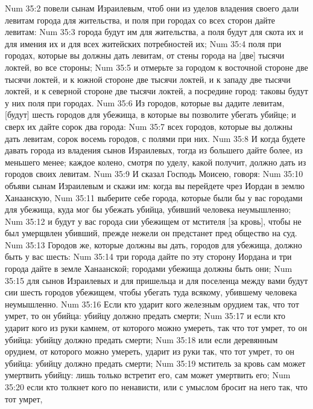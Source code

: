 \vs Num 35:2 повели сынам Израилевым, чтоб они из уделов владения своего дали левитам города для жительства, и поля при городах со всех сторон дайте левитам:
\vs Num 35:3 города будут им для жительства, а поля будут для скота их и для имения их и для всех житейских потребностей их;
\vs Num 35:4 поля при городах, которые вы должны дать левитам, от стены города  на [две] тысячи локтей, во все стороны;
\vs Num 35:5 и отмерьте за городом к восточной стороне две тысячи локтей, и к южной стороне две тысячи локтей, и к западу две тысячи локтей, и к северной стороне две тысячи локтей, а посредине город: таковы будут у них поля при городах.
\vs Num 35:6 Из городов, которые вы дадите левитам, [будут] шесть городов для убежища, в которые вы позволите убегать убийце; и сверх их дайте сорок два города:
\vs Num 35:7 всех городов, которые вы должны дать левитам,  сорок восемь городов, с полями при них.
\vs Num 35:8 И когда будете давать города из владения сынов Израилевых, тогда из большего дайте более, из меньшего менее; каждое колено, смотря по уделу, какой получит, должно дать из городов своих левитам.
\rsbpar\vs Num 35:9 И сказал Господь Моисею, говоря:
\vs Num 35:10 объяви сынам Израилевым и скажи им: когда вы перейдете чрез Иордан в землю Ханаанскую,
\vs Num 35:11 выберите себе города, которые были бы у вас городами для убежища, куда мог бы убежать убийца, убивший человека неумышленно;
\vs Num 35:12 и будут у вас города сии убежищем от мстителя [за кровь], чтобы не был умерщвлен убивший, прежде нежели он предстанет пред общество на суд.
\vs Num 35:13 Городов же, которые должны вы дать, городов для убежища, должно быть у вас шесть:
\vs Num 35:14 три города дайте по эту сторону Иордана и три города дайте в земле Ханаанской; городами убежища должны быть они;
\vs Num 35:15 для сынов Израилевых и для пришельца и для поселенца между вами будут сии шесть городов убежищем, чтобы убегать туда всякому, убившему человека неумышленно.
\vs Num 35:16 Если кто ударит кого железным орудием так, что тот умрет, то он убийца: убийцу должно предать смерти;
\vs Num 35:17 и если кто ударит кого из руки камнем, от которого можно умереть, так что тот умрет, то он убийца: убийцу должно предать смерти;
\vs Num 35:18 или если деревянным орудием, от которого можно умереть, ударит из руки так, что тот умрет, то он убийца: убийцу должно предать смерти;
\vs Num 35:19 мститель за кровь сам может умертвить убийцу: лишь только встретит его, сам может умертвить его;
\vs Num 35:20 если кто толкнет кого по ненависти, или с умыслом бросит на него  так, что тот умрет,

